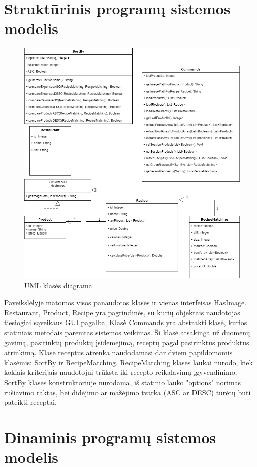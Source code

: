 \documentclass{VUMIFInfKursinis}
\begin{document}
\section{Struktūrinis programų sistemos modelis}
\begin{figure}[H]
    \centering
 \includegraphics[scale=0.5]{img/ClassD}
    \caption{UML klasės diagrama}   %
    \label{img:mlp}
\end{figure}
\bigskip
Paveikslėlyje matomos visos panaudotos klasės ir vienas interfeisas HasImage. Restaurant, Product, Recipe yra pagrindinės,
 su kurių objektais naudotojas tiesiogiai sąveikaus GUI pagalba. Klasė Commands yra abstrakti klasė, kurios statiniais 
metodais paremtas sistemos veikimas. Ši klasė atsakinga už duomenų gavimą, pasirinktų produktų įsidemėjimą, 
receptų pagal pasirinktus produktus atrinkimą. Klasė receptus atrenka naudodamasi dar dviem papildomomis klasėmis: 
SortBy ir RecipeMatching. RecipeMatching klasės laukai nurodo, kiek kokiais kriterijais naudotojui trūksta iki 
recepto reikalavimų įgyvendinimo. SortBy klasės konstruktoriuje nurodama, iš statinio lauko "options" norimas rūšiavimo raktas,
 bei didėjimo ar mažėjimo tvarka (ASC ar DESC) turėtų būti pateikti receptai.
\section{Dinaminis programų sistemos modelis}
\end{document}
